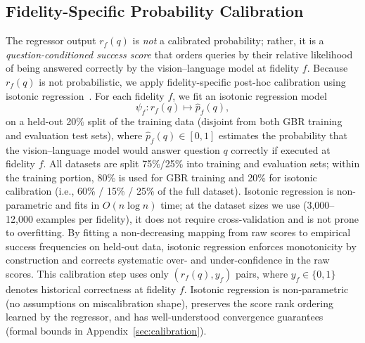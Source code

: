 \subsection{Fidelity-Specific Probability Calibration}
\label{sec:voila_calibration}

The regressor output $r_f(q)$ is \emph{not} a calibrated probability; rather, it is a \emph{question-conditioned success score} that orders queries by their relative likelihood of being answered correctly by the vision--language model at fidelity $f$.
Because $r_f(q)$ is not probabilistic, we apply fidelity-specific post-hoc calibration using isotonic regression~\cite{guo2017calibrationmodernneuralnetworks}.
For each fidelity $f$, we fit an isotonic regression model
\[
\psi_f: r_f(q) \mapsto \hat{p}_f(q),
\]
on a held-out 20\% split of the training data (disjoint from both GBR training and evaluation test sets), where $\hat{p}_f(q) \in [0,1]$ estimates the probability that the vision--language model would answer question $q$ correctly if executed at fidelity $f$.
All datasets are split 75\%/25\% into training and evaluation sets; within the training portion, 80\% is used for GBR training and 20\% for isotonic calibration (i.e., 60\% / 15\% / 25\% of the full dataset).
Isotonic regression is non-parametric and fits in $O(n \log n)$ time; at the dataset sizes we use (3{,}000--12{,}000 examples per fidelity), it does not require cross-validation and is not prone to overfitting. By fitting a non-decreasing mapping from raw scores to empirical success frequencies on held-out data, isotonic regression enforces monotonicity by construction and corrects systematic over- and under-confidence in the raw scores.
This calibration step uses only $(r_f(q), y_f)$ pairs, where $y_f \in \{0,1\}$ denotes historical correctness at fidelity $f$. %
Isotonic regression is non-parametric (no assumptions on miscalibration shape), preserves the score rank ordering learned by the regressor, and has well-understood convergence guarantees~\cite{guo2017calibrationmodernneuralnetworks} (formal bounds in Appendix~\ref{sec:calibration}).
